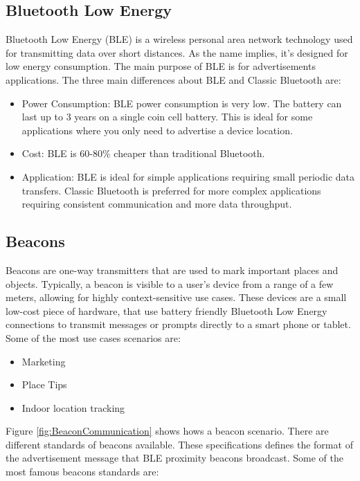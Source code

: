 \documentclass[12pt]{article}
\begin{document}
\subsection{Bluetooth Low Energy}

Bluetooth Low Energy (BLE) is a wireless personal area network technology used for transmitting data over short distances\cite{IBeacon.com2016}. As the name implies, it's designed for low energy consumption. The main purpose of BLE is for advertisements applications. The three main differences about BLE and Classic Bluetooth are:

\begin{itemize}
 \item Power Consumption: BLE power consumption is very low. The battery can last up to 3 years on a single coin cell battery. This is ideal for some applications where you only need to advertise a device location.
 \item Cost: BLE is 60-80\% cheaper than traditional Bluetooth.
 \item Application: BLE is ideal for simple applications requiring small periodic data transfers. Classic Bluetooth is preferred for more complex applications requiring consistent communication and more data throughput.
\end{itemize}

\subsection{Beacons}

Beacons are one-way transmitters that are used to mark important places and objects\cite{Google2016}. Typically, a beacon is visible to a user's device from a range of a few meters, allowing for highly context-sensitive use cases. These devices are a small low-cost piece of hardware, that use battery friendly Bluetooth Low Energy connections to transmit messages or prompts directly to a smart phone or tablet. Some of the most use cases scenarios are:

\begin{itemize}
  \item Marketing
  \item Place Tips
  \item Indoor location tracking
\end{itemize}

Figure \ref{fig:BeaconCommunication} shows hows a beacon scenario. There are different standards of beacons available. These specifications defines the format of the advertisement message that BLE proximity beacons broadcast. Some of the most famous beacons standards are:
\end{document}
